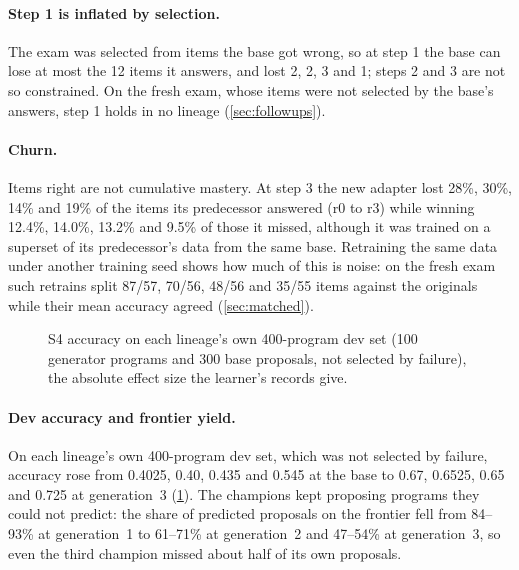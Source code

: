 \paragraph{Step 1 is inflated by selection.} The exam was selected from items the base got wrong, so
at step 1 the base can lose at most the 12 items it answers, and lost 2, 2, 3 and 1; steps 2 and 3 are
not so constrained. On the fresh exam, whose items were not selected by the base's answers,
step 1 holds in no lineage (\cref{sec:followups}).

\paragraph{Churn.} Items right are not cumulative mastery. At step 3 the new adapter lost 28\%, 30\%,
14\% and 19\% of the items its predecessor answered (r0 to r3) while winning 12.4\%, 14.0\%, 13.2\% and
9.5\% of those it missed, although it was trained on a superset of its predecessor's data from the same
base. Retraining the same data under another training seed shows how much of this is noise:
on the fresh exam such retrains split 87/57, 70/56, 48/56 and 35/55 items against the originals while
their mean accuracy agreed (\cref{sec:matched}).

\begin{figure}[tbp]
\centering
{}
\caption{S4 accuracy on each lineage's own 400-program dev set (100 generator programs and 300 base
proposals, not selected by failure), the absolute effect size the learner's records give.}\label{fig:dev}
\end{figure}

\paragraph{Dev accuracy and frontier yield.} On each lineage's own 400-program dev set, which was not
selected by failure, accuracy rose from 0.4025, 0.40, 0.435 and 0.545 at the base to 0.67, 0.6525, 0.65
and 0.725 at generation~3 (\cref{fig:dev}). The champions kept proposing programs they could
not predict: the share of predicted proposals on the frontier fell from 84--93\% at generation~1 to
61--71\% at generation~2 and 47--54\% at generation~3, so even the third champion missed about half of
its own proposals.

